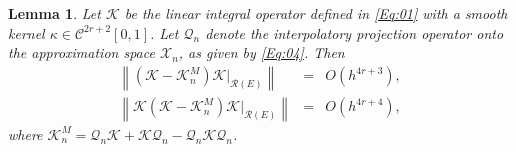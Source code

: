 \documentclass[]{interact}
\theoremstyle{plain}%
\newtheorem{lemma}[theorem]{Lemma}
\theoremstyle{definition}
\theoremstyle{remark}
\newcommand{\norm}[1]{\left\lVert #1\right\rVert}
\begin{document}
\begin{lemma} \label{Lem:05}
	Let \(\mathcal{K}\) be the linear integral operator defined in \eqref{Eq:01} with a smooth kernel $\kappa \in \mathcal{C}^{2r+2}[0,1]$. Let \(\mathcal{Q}_n\) denote the interpolatory projection operator onto the approximation space \(\mathcal{X}_n\), as given by \eqref{Eq:04}. Then 
	\begin{eqnarray*}
		\norm{(\mathcal{K} - \mathcal{K}_n^M) \mathcal{K} |_{\mathcal{R}(E)}} 
		&=& O\left(h^{4r+3}\right), \\
		\norm{\mathcal{K} (\mathcal{K} - \mathcal{K}_n^M) \mathcal{K} |_{\mathcal{R}(E)}} 
		&=& O\left(h^{4r+4}\right),
	\end{eqnarray*}
	where \(\mathcal{K}_n^M = \mathcal{Q}_n \mathcal{K} + \mathcal{K} \mathcal{Q}_n - \mathcal{Q}_n \mathcal{K} \mathcal{Q}_n\).
\end{lemma}
\vspace*{-0.2in}
\end{document}
